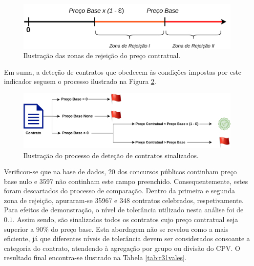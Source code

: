 \begin{figure}[H]
	\centering
	\includegraphics[width=.8\textwidth]{imagens/r31/r31.png}
	\caption{Ilustração das zonas de rejeição do preço contratual. }
	\label{fig:rej}
\end{figure}

Em suma, a deteção de contratos que obedecem às condições impostas por este indicador seguem o processo ilustrado na Figura \ref{fig:r31}. 

\begin{figure}[H]
	\centering
	\includegraphics[width=\textwidth]{imagens/r31/r31procss.png}
	\caption{Ilustração do processo de deteção de contratos sinalizados. }
	\label{fig:r31}
\end{figure}

Verificou-se que na base de dados, 20 dos concursos públicos continham preço base nulo e 3597 não continham este campo preenchido. Consequentemente, estes foram descartados do processo de comparação. 
Dentro da primeira e segunda zona de rejeição, apuraram-se 35967 e 348 contratos celebrados, respetivamente. Para efeitos de demonstração, o nível de tolerância utilizado nesta análise foi de $0.1$. Assim sendo, são sinalizados todos os contratos cujo preço contratual seja superior a $90\%$ do preço base. Esta abordagem não se revelou como a mais eficiente, já que diferentes níveis de tolerância devem ser considerados consoante a categoria do contrato, atendendo à agregação por grupo ou divisão do CPV. O resultado final encontra-se ilustrado na Tabela \ref{tab:r31vales}. 

